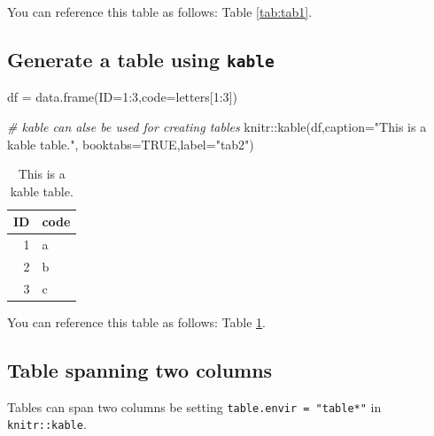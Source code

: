 \documentclass[webpdf,large,contemporary,namedate]{oup-authoring-template}
\newenvironment{Shaded}{\begin{snugshade}}{\end{snugshade}}
\newcommand{\AttributeTok}[1]{\textcolor[rgb]{0.77,0.63,0.00}{#1}}
\newcommand{\CommentTok}[1]{\textcolor[rgb]{0.56,0.35,0.01}{\textit{#1}}}
\newcommand{\ConstantTok}[1]{\textcolor[rgb]{0.00,0.00,0.00}{#1}}
\newcommand{\DecValTok}[1]{\textcolor[rgb]{0.00,0.00,0.81}{#1}}
\newcommand{\FunctionTok}[1]{\textcolor[rgb]{0.00,0.00,0.00}{#1}}
\newcommand{\NormalTok}[1]{#1}
\newcommand{\OtherTok}[1]{\textcolor[rgb]{0.56,0.35,0.01}{#1}}
\newcommand{\SpecialCharTok}[1]{\textcolor[rgb]{0.00,0.00,0.00}{#1}}
\newcommand{\StringTok}[1]{\textcolor[rgb]{0.31,0.60,0.02}{#1}}
\theoremstyle{thmstyleone}
\theoremstyle{thmstyletwo}
\theoremstyle{thmstylethree}
\begin{document}
You can reference this table as follows: Table \ref{tab:tab1}.

\hypertarget{generate-a-table-using-kable}{%
\subsection{\texorpdfstring{Generate a table using
\texttt{kable}}{Generate a table using kable}}\label{generate-a-table-using-kable}}

\begin{Shaded}
\begin{Highlighting}[]
\NormalTok{df }\OtherTok{=} \FunctionTok{data.frame}\NormalTok{(}\AttributeTok{ID=}\DecValTok{1}\SpecialCharTok{:}\DecValTok{3}\NormalTok{,}\AttributeTok{code=}\NormalTok{letters[}\DecValTok{1}\SpecialCharTok{:}\DecValTok{3}\NormalTok{])}

\CommentTok{\# kable can alse be used for creating tables}
\NormalTok{knitr}\SpecialCharTok{::}\FunctionTok{kable}\NormalTok{(df,}\AttributeTok{caption=}\StringTok{"This is a kable table."}\NormalTok{,}
             \AttributeTok{booktabs=}\ConstantTok{TRUE}\NormalTok{,}\AttributeTok{label=}\StringTok{"tab2"}\NormalTok{)}
\end{Highlighting}
\end{Shaded}

\begin{table}

\caption{\label{tab:tab2}This is a kable table.}
\centering
\begin{tabular}[t]{rl}
\toprule
ID & code\\
\midrule
1 & a\\
2 & b\\
3 & c\\
\bottomrule
\end{tabular}
\end{table}

You can reference this table as follows: Table \ref{tab:tab2}.

\hypertarget{table-spanning-two-columns}{%
\subsection{Table spanning two
columns}\label{table-spanning-two-columns}}

Tables can span two columns be setting \texttt{table.envir\ =\ "table*"}
in \texttt{knitr::kable}.
\end{document}
